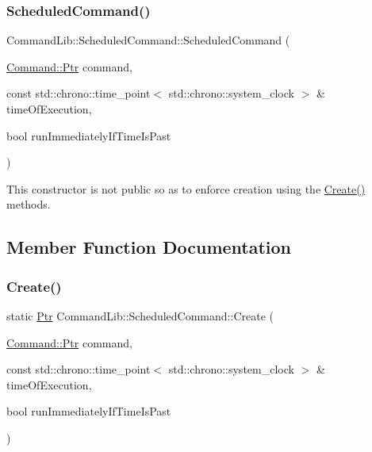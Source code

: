 \subsubsection{\texorpdfstring{Scheduled\+Command()}{ScheduledCommand()}}
{\footnotesize\ttfamily Command\+Lib\+::\+Scheduled\+Command\+::\+Scheduled\+Command (\begin{DoxyParamCaption}\item[{\mbox{\hyperlink{class_command_lib_1_1_command_a3b3e4f00144373299df5c6bb1acc319d}{Command\+::\+Ptr}}}]{command,  }\item[{const std\+::chrono\+::time\+\_\+point$<$ std\+::chrono\+::system\+\_\+clock $>$ \&}]{time\+Of\+Execution,  }\item[{bool}]{run\+Immediately\+If\+Time\+Is\+Past }\end{DoxyParamCaption})\hspace{0.3cm}{\ttfamily [protected]}}



This constructor is not public so as to enforce creation using the \mbox{\hyperlink{class_command_lib_1_1_scheduled_command_abf6008570965c8931d9c1bd8cd4f7b6a}{Create()}} methods. 



\subsection{Member Function Documentation}
\mbox{\label{class_command_lib_1_1_scheduled_command_abf6008570965c8931d9c1bd8cd4f7b6a}} 
\subsubsection{\texorpdfstring{Create()}{Create()}}
{\footnotesize\ttfamily static \mbox{\hyperlink{class_command_lib_1_1_command_a3b3e4f00144373299df5c6bb1acc319d}{Ptr}} Command\+Lib\+::\+Scheduled\+Command\+::\+Create (\begin{DoxyParamCaption}\item[{\mbox{\hyperlink{class_command_lib_1_1_command_a3b3e4f00144373299df5c6bb1acc319d}{Command\+::\+Ptr}}}]{command,  }\item[{const std\+::chrono\+::time\+\_\+point$<$ std\+::chrono\+::system\+\_\+clock $>$ \&}]{time\+Of\+Execution,  }\item[{bool}]{run\+Immediately\+If\+Time\+Is\+Past }\end{DoxyParamCaption})\hspace{0.3cm}{\ttfamily [static]}}



